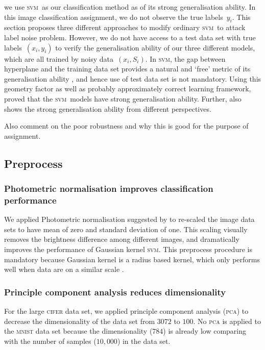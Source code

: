 \documentclass[12pt]{article} %
\newcommand{\svm}{\textsc{svm}}
\begin{document}
we use \svm\ as our classification method as of its strong generalisation ability. In this image classification assignment, we do not observe the true  labels~$y_i$. This section proposes three different approaches to modify ordinary \svm\ to attack label noise problem. However, we do not have access to a test data set with true labels~$(x_i,y_i)$ to verify the generalisation ability of our three different models, which are all trained by noisy data~$(x_i,S_i)$. In \svm , the gap between hyperplane and the training data set provides a natural and `free' metric of its generalisation ability  \citep{hastie01statisticallearning}, and hence use of test data set is not mandatory. Using this geometry factor as well as probably approximately correct learning framework,  \citet{NIPS2012_4500} proved that the  \svm\ models have strong generalisation ability. Further,  \citep{Cortes1995,Seeger:2003:PGE:944919.944929} also shows the strong generalisation ability from different perspectives.

{\color{red}Also comment on the poor robustness and why this is good for the purpose of assignment.}

\subsection{Preprocess}
\subsubsection{Photometric normalisation improves classification performance}
We applied Photometric normalisation suggested by \citet{jonsson2002support} to re-scaled the image data sets to have mean of zero and standard deviation of one. This scaling visually removes the brightness difference among different images, and dramatically improves the performance of Gaussian kernel \svm . This preprocess procedure is mandatory because Gaussian kernel is a radius based kernel, which only performs well when data are on a similar scale \citep{jonsson2002support}. 

\subsubsection{Principle component analysis reduces dimensionality}
For the large \textsc{cifer} data set, we applied principle component analysis (\textsc{pca}) to decrease the dimensionality of the data set from $3072$ to $100$. No \textsc{pca} is applied to the \textsc{mnist} data set because the dimensionality ($784$) is already low comparing with the number of samples ($10,000$) in the data set.
\end{document}
